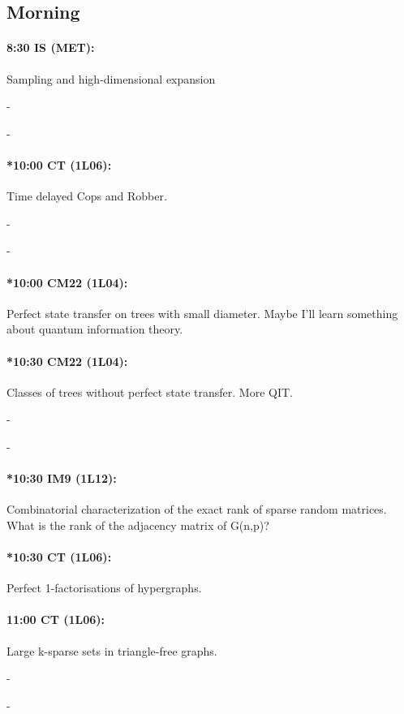 \documentclass[12]{article}
\theoremstyle{definition}
\begin{document}
	\subsection{Morning}
	\paragraph{8:30 IS (MET):} Sampling and high-dimensional expansion
	
	-
	
	-
	
	\paragraph{*10:00 CT (1L06):} Time delayed Cops and Robber.
	
	-
	
	-
	
	\paragraph{*10:00 CM22 (1L04):} Perfect state transfer on trees with small diameter.
	Maybe I'll learn something about quantum information theory.
	
	\paragraph{*10:30 CM22 (1L04):} Classes of trees without perfect state transfer.
	More QIT.
	
	-
	
	-
	
	\paragraph{*10:30 IM9 (1L12):} Combinatorial characterization of the exact rank of sparse random matrices.  What is the rank of the adjacency matrix of G(n,p)?
	
	\paragraph{*10:30 CT (1L06):} Perfect 1-factorisations of hypergraphs.
	
	\paragraph{11:00 CT (1L06):} Large k-sparse sets in triangle-free graphs.
	
	-
	
	-
	
\end{document}
